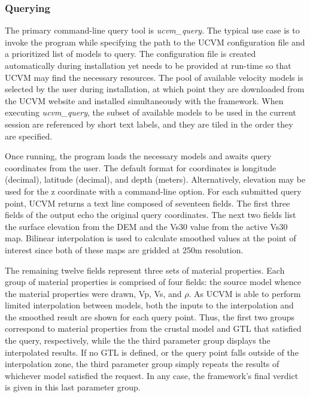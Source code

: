\subsubsection{Querying}

The primary command-line query tool is \emph{ucvm\_query}. The typical use case is to invoke the program while specifying the path to the UCVM configuration file and a prioritized list of models to query. The configuration file is created automatically during installation yet needs to be provided at run-time so that UCVM may find the necessary resources. The pool of available velocity models is selected by the user during installation, at which point they are downloaded from the UCVM website and installed simultaneously with the framework. When executing \emph{ucvm\_query}, the subset of available models to be used in the current session are referenced by short text labels, and they are tiled in the order they are specified.

Once running, the program loads the necessary models and awaits query coordinates from the user. The default format for coordinates is longitude (decimal), latitude (decimal), and depth (meters). Alternatively, elevation may be used for the z coordinate with a command-line option. For each submitted query point, UCVM returns a text line composed of seventeen fields. The first three fields of the output echo the original query coordinates. The next two fields list the surface elevation from the DEM and the Vs30 value from the active Vs30 map. Bilinear interpolation is used to calculate smoothed values at the point of interest since both of these maps are gridded at 250m resolution.

The remaining twelve fields represent three sets of material properties. Each group of material properties is comprised of four fields: the source model whence the material properties were drawn, Vp, Vs, and $\rho$. As UCVM is able to perform limited interpolation between models, both the inputs to the interpolation and the smoothed result are shown for each query point. Thus, the first two groups correspond to material properties from the crustal model and GTL that satisfied the query, respectively, while the the third parameter group displays the interpolated results. If no GTL is defined, or the query point falls outside of the interpolation zone, the third parameter group simply repeats the results of whichever model satisfied the request. In any case, the framework's final verdict is given in this last parameter group.


